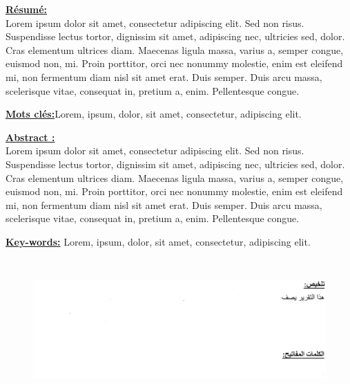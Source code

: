 \fontsize{12pt}{12pt}\selectfont%
\underline{\textbf{Résumé:}}\\
Lorem ipsum dolor sit amet, consectetur adipiscing elit. Sed non risus. Suspendisse lectus tortor, dignissim sit amet, adipiscing nec, ultricies sed, dolor. Cras elementum ultrices diam. Maecenas ligula massa, varius a, semper congue, euismod non, mi. Proin porttitor, orci nec nonummy molestie, enim est eleifend mi, non fermentum diam nisl sit amet erat. Duis semper. Duis arcu massa, scelerisque vitae, consequat in, pretium a, enim. Pellentesque congue.\par
\begin{spacing}{1}
\underline{\textbf{Mots clés:}}Lorem, ipsum, dolor, sit amet, consectetur, adipiscing elit.\\
\end{spacing}
\underline{\textbf{Abstract :}}\\
Lorem ipsum dolor sit amet, consectetur adipiscing elit. Sed non risus. Suspendisse lectus tortor, dignissim sit amet, adipiscing nec, ultricies sed, dolor. Cras elementum ultrices diam. Maecenas ligula massa, varius a, semper congue, euismod non, mi. Proin porttitor, orci nec nonummy molestie, enim est eleifend mi, non fermentum diam nisl sit amet erat. Duis semper. Duis arcu massa, scelerisque vitae, consequat in, pretium a, enim. Pellentesque congue.\par
\begin{spacing}{1}
\underline{\textbf{Key-words:}} Lorem, ipsum, dolor, sit amet, consectetur, adipiscing elit.\\
\end{spacing}
\begin{figure}[H]%
    \center%
    \includegraphics[width=16cm,height=5.41cm]{images/arabic.jpg}%
\end{figure}


    